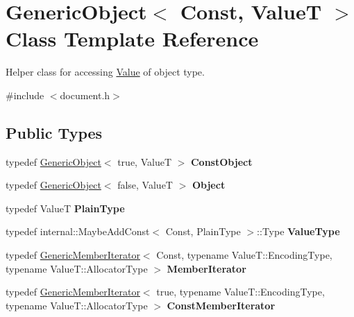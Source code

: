 \hypertarget{classGenericObject}{}\section{Generic\+Object$<$ Const, ValueT $>$ Class Template Reference}
\label{classGenericObject}


Helper class for accessing \hyperlink{classValue}{Value} of object type.  




{\ttfamily \#include $<$document.\+h$>$}

\subsection*{Public Types}
\begin{DoxyCompactItemize}
\item 
\mbox{\label{classGenericObject_aeee588f9a85e88cac89b7c4dfb6b0bd3}} 
typedef \hyperlink{classGenericObject}{Generic\+Object}$<$ true, ValueT $>$ {\bfseries Const\+Object}
\item 
\mbox{\label{classGenericObject_ae8f5673d0cf8e7ebfd2d4f6ab27b632d}} 
typedef \hyperlink{classGenericObject}{Generic\+Object}$<$ false, ValueT $>$ {\bfseries Object}
\item 
\mbox{\label{classGenericObject_a4c25f4a5f696745c418b91ad9f577f12}} 
typedef ValueT {\bfseries Plain\+Type}
\item 
\mbox{\label{classGenericObject_a930aa30f89caee7ba7bff60bf9dc21b1}} 
typedef internal\+::\+Maybe\+Add\+Const$<$ Const, Plain\+Type $>$\+::Type {\bfseries Value\+Type}
\item 
\mbox{\label{classGenericObject_a1f531d70f8d57ed30199ac445b5935e6}} 
typedef \hyperlink{classGenericMemberIterator}{Generic\+Member\+Iterator}$<$ Const, typename Value\+T\+::\+Encoding\+Type, typename Value\+T\+::\+Allocator\+Type $>$ {\bfseries Member\+Iterator}
\item 
\mbox{\label{classGenericObject_af16706c0ad32b957c56e7d0541628cd5}} 
typedef \hyperlink{classGenericMemberIterator}{Generic\+Member\+Iterator}$<$ true, typename Value\+T\+::\+Encoding\+Type, typename Value\+T\+::\+Allocator\+Type $>$ {\bfseries Const\+Member\+Iterator}

\end{DoxyCompactItemize}
